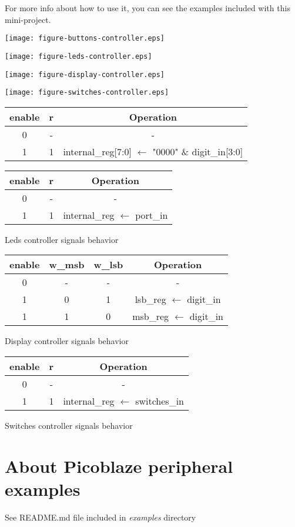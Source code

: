 \documentclass[10pt,a4paper,onecolumn]{article}
\begin{document}
For more info about how to use it, you can see the examples included with this mini-project.
\begin{center}

  \texttt{[image: figure-buttons-controller.eps]}
  \label{fig:unitbuttons}
  
  \texttt{[image: figure-leds-controller.eps]}
  \label{fig:unit-leds}

  \texttt{[image: figure-display-controller.eps]}
  \label{fig:unit-display}
  
  \texttt{[image: figure-switches-controller.eps]}
  \label{fig:unit-switches}


\centering
\begin{tabular}{|c|c|c|}
\hline 
enable & r & Operation \\ 
\hline 
\hline 
0 & - & - \\ 
\hline 
1 & 1  & internal\_reg[7:0] ${\leftarrow}$ "0000" \& digit\_in[3:0] \\
\hline 
\end{tabular}

\centering
\begin{tabular}{|c|c|c|}
\hline 
enable & r & Operation \\ 
\hline 
\hline 
0 & - & - \\ 
\hline 
1 & 1  & internal\_reg ${\leftarrow}$ port\_in \\
\hline 
\end{tabular}
\caption{Leds controller signals behavior}

\centering
\begin{tabular}{|c|c|c|c|}
\hline 
enable & w\_msb & w\_lsb & Operation \\ 
\hline 
\hline 
0 & - & - & - \\ 
\hline 
1 & 0 & 1 & lsb\_reg ${\leftarrow}$ digit\_in \\ 
\hline 
1 & 1 & 0 & msb\_reg ${\leftarrow}$ digit\_in \\ 
\hline 
\end{tabular}
\caption{Display controller signals behavior}




\centering
\begin{tabular}{|c|c|c|}
\hline 
enable & r & Operation \\ 
\hline 
\hline 
0 & - & - \\ 
\hline 
1 & 1  & internal\_reg ${\leftarrow}$ switches\_in \\
\hline 
\end{tabular}
\caption{Switches controller signals behavior}


\end{center}

\section*{About Picoblaze peripheral examples}

See README.md file included in \emph{examples} directory 
\end{document}

